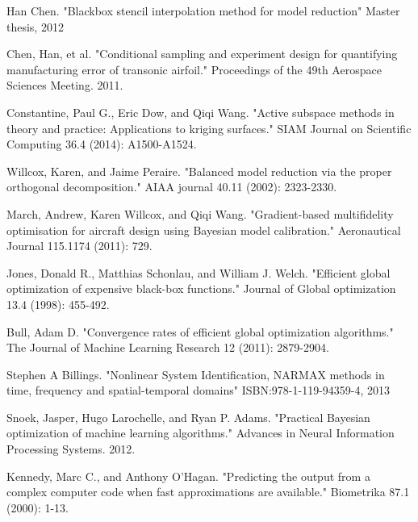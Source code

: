 \documentclass[a4paper,onecolumn]{article}
\theoremstyle{remark}
\begin{document}
\begin{appendices}

\end{appendices}

\begin{thebibliography}{9}
Han Chen.
"Blackbox stencil interpolation method for model reduction"
Master thesis, 2012

Chen, Han, et al. 
"Conditional sampling and experiment design for quantifying manufacturing error of transonic airfoil." 
Proceedings of the 49th Aerospace Sciences Meeting. 2011.

Constantine, Paul G., Eric Dow, and Qiqi Wang. 
"Active subspace methods in theory and practice: Applications to kriging surfaces." 
SIAM Journal on Scientific Computing 36.4 (2014): A1500-A1524.

Willcox, Karen, and Jaime Peraire. 
"Balanced model reduction via the proper orthogonal decomposition." 
AIAA journal 40.11 (2002): 2323-2330.

March, Andrew, Karen Willcox, and Qiqi Wang. 
"Gradient-based multifidelity optimisation for aircraft design using Bayesian model calibration." 
Aeronautical Journal 115.1174 (2011): 729.

Jones, Donald R., Matthias Schonlau, and William J. Welch. 
"Efficient global optimization of expensive black-box functions." 
Journal of Global optimization 13.4 (1998): 455-492.

Bull, Adam D. 
"Convergence rates of efficient global optimization algorithms." 
The Journal of Machine Learning Research 12 (2011): 2879-2904.

Stephen A Billings.
"Nonlinear System Identification, NARMAX methods in time, frequency and spatial-temporal domains"
ISBN:978-1-119-94359-4, 2013

Snoek, Jasper, Hugo Larochelle, and Ryan P. Adams. 
"Practical Bayesian optimization of machine learning algorithms." 
Advances in Neural Information Processing Systems. 2012.

Kennedy, Marc C., and Anthony O'Hagan. 
"Predicting the output from a complex computer code when fast approximations are available." 
Biometrika 87.1 (2000): 1-13.


\end{thebibliography}
\end{document}
